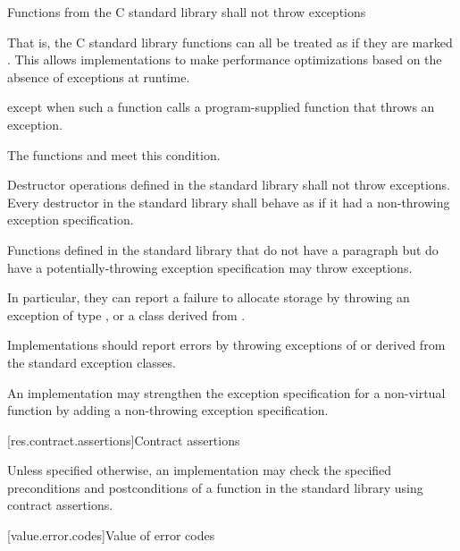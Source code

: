 \pnum
Functions from the C standard library shall not throw exceptions%
%
\begin{footnote}
That is, the C standard library functions can all be treated as if they
are marked .
This allows implementations to make performance optimizations
based on the absence of exceptions at runtime.
\end{footnote}
except when such a function calls a program-supplied function that throws an
exception.
\begin{footnote}
The functions
and
 meet this condition.
\end{footnote}

\pnum
Destructor operations defined in the \Cpp{} standard library
shall not throw exceptions.
Every destructor in the \Cpp{} standard library shall behave as if it had a
non-throwing exception specification.

\pnum
Functions defined in the
\Cpp{} standard library
%
that do not have a \throws paragraph
but do have a potentially-throwing exception specification
may throw  exceptions.
\begin{footnote}
In particular, they
can report a failure to allocate storage by throwing an exception of type
,
or a class derived from
.
\end{footnote}
Implementations should
report errors by throwing exceptions of or derived
from the standard
exception classes.

\pnum
An implementation may strengthen the
exception specification
for a non-virtual function
by adding a non-throwing exception specification.

[res.contract.assertions]{Contract assertions}

\pnum
Unless specified otherwise,
an implementation may check
the specified preconditions and postconditions of a function
in the \Cpp{} standard library using contract
assertions.

[value.error.codes]{Value of error codes}

